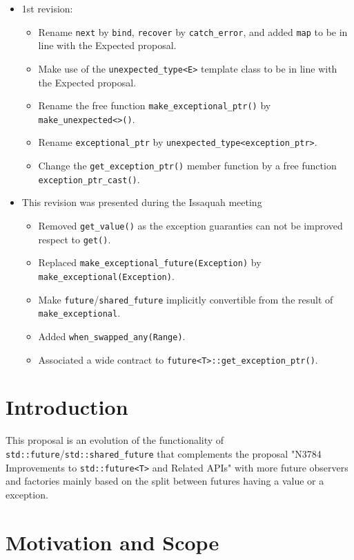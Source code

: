 \documentclass[a4paper,10pt]{article}
\newcommand{\cpp}[1]{\lstinline{#1}}
\newcommand{\update}[1]{\colorbox{update_color}{#1}}
\begin{document}
\begin{itemize}
\item \update{1st revision: }
\begin{itemize}
\item \update{Rename \cpp{next} by  \cpp{bind},  \cpp{recover} by  \cpp{catch_error}, and added  \cpp{map} to be in line with the Expected proposal.}
\item \update{Make use of the  \cpp{unexpected_type<E>} template class to be in line with the Expected proposal.}
\item \update{Rename the free function \cpp{make_exceptional_ptr()} by \cpp{make_unexpected<>()}.}
\item \update{Rename \cpp{exceptional_ptr} by  \cpp{unexpected_type<exception_ptr>}.}
\item \update{Change the \cpp{get_exception_ptr()} member function by a free function \cpp{exception_ptr_cast()}.}
\end{itemize}

\item This revision was presented during the Issaquah meeting
\begin{itemize}
\item Removed \cpp{get_value()} as the exception guaranties can not be improved respect to \cpp{get()}. 
\item Replaced \cpp{make_exceptional_future(Exception)} by \cpp{make_exceptional(Exception)}. 
\item Make \cpp{future}/\cpp{shared_future} implicitly convertible from the result of \cpp{make_exceptional}. 
\item Added \cpp{when_swapped_any(Range)}. 
\item Associated a wide contract to \cpp{future<T>::get_exception_ptr()}.
\end{itemize}
\end{itemize}

\section{Introduction}

This proposal is an evolution of the functionality of \cpp{std::future}/\cpp{std::shared_future} that complements the proposal "N3784 Improvements to \cpp{std::future<T>} and Related APIs"  \cite{N3784} with more future observers and factories mainly based on the split between futures having a value or a exception.

\section{Motivation and Scope}
\end{document}
